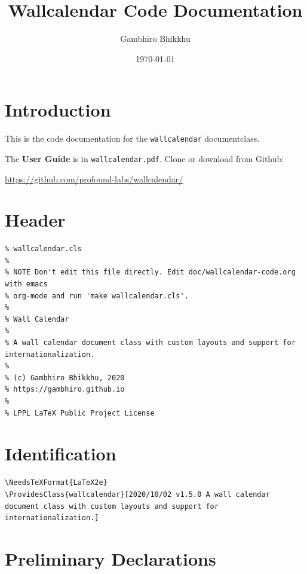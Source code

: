 \documentclass[11pt,oneside]{memoir-article}
\author{Gambhīro Bhikkhu}
\date{\today}
\title{Wallcalendar Code Documentation}
\begin{document}
\maketitle

\chapter{Introduction}
\label{sec:orgeb2dca0}

\bigskip

This is the code documentation for the \texttt{wallcalendar} documentclass.

The \textbf{User Guide} is in \texttt{wallcalendar.pdf}. Clone or download from Github:

\href{https://github.com/profound-labs/wallcalendar/}{https://github.com/profound-labs/wallcalendar/}

\bigskip

\tableofcontents*

\clearpage

\chapter{Header}
\label{sec:org40837a7}

\begin{verbatim}
% wallcalendar.cls
%
% NOTE Don't edit this file directly. Edit doc/wallcalendar-code.org with emacs
% org-mode and run 'make wallcalendar.cls'.
%
% Wall Calendar
%
% A wall calendar document class with custom layouts and support for internationalization.
%
% (c) Gambhiro Bhikkhu, 2020
% https://gambhiro.github.io
%
% LPPL LaTeX Public Project License
\end{verbatim}

\chapter{Identification}
\label{sec:org77b24b1}

\begin{verbatim}
\NeedsTeXFormat{LaTeX2e}
\ProvidesClass{wallcalendar}[2020/10/02 v1.5.0 A wall calendar document class with custom layouts and support for internationalization.]
\end{verbatim}

\chapter{Preliminary Declarations}
\label{sec:org664a2a7}
\end{document}
